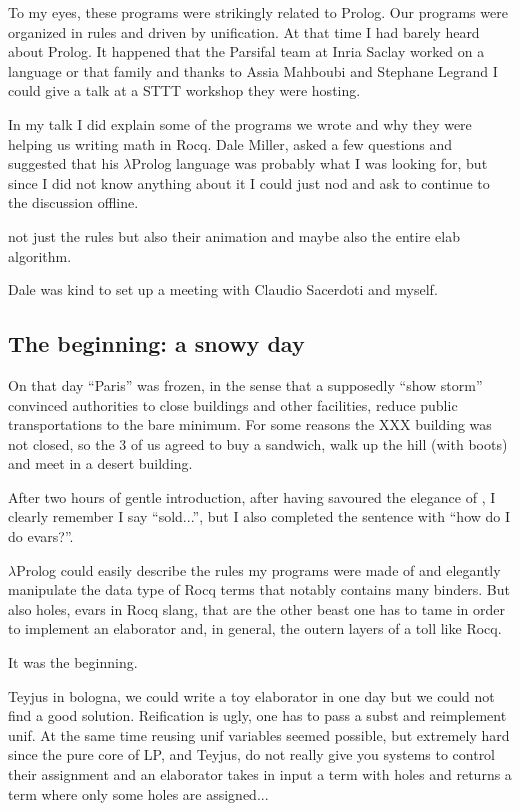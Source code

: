 \documentclass[a4paper, 11pt]{book}
\begin{document}
To my eyes, these programs were strikingly related to Prolog.
Our programs were organized in rules and driven by unification.
At that time I had barely heard about Prolog.
It happened that the Parsifal team
at Inria Saclay worked on a language or that family
and thanks to Assia Mahboubi and Stephane Legrand I could give a talk
at a STTT workshop they were hosting.

In my talk I did explain some of the programs we wrote and why they
were helping us writing math in Rocq. Dale Miller, asked a few questions
and suggested that his $\lambda$Prolog language was probably what I
was looking for, but since I did not know anything about it I could
just nod and ask to continue to the discussion offline.

not just the rules but also their animation and maybe also the entire
elab algorithm.

Dale was kind
to set up a meeting with Claudio Sacerdoti and myself. 

\subsection{The beginning: a snowy day}

On that day ``Paris'' was frozen, in the sense that a supposedly
``show storm'' convinced authorities to close buildings and other facilities,
reduce public transportations to the bare minimum. For some reasons
the XXX building was not closed, so the 3 of us agreed to buy a sandwich,
walk up the hill (with boots) and meet in a desert building.

After two hours of gentle introduction, after having savoured the
elegance of , I clearly remember I say ``sold...'',
but I also completed the sentence with ``how do I do evars?''.

$\lambda$Prolog could easily describe the rules my programs were
made of and elegantly manipulate the data type of Rocq terms that
notably contains many binders. But also holes, evars in Rocq slang,
that are the other beast one has to tame in order to implement an
elaborator and, in general, the outern layers of a toll like Rocq.

It was the beginning.

Teyjus in bologna, we could write a toy elaborator in one day
but we could not find a good solution. Reification is ugly, one has
to pass a subst and reimplement unif. At the same time reusing unif
variables seemed possible, but extremely hard since the pure core
of LP, and Teyjus, do not really give you systems to control their
assignment and an elaborator takes in input a term with holes
and returns a term where only some holes are assigned...
\end{document}
